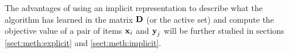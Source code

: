 The advantages of using an implicit representation to describe what the \mlblink algorithm has learned in the matrix $\boldsymbol{\mathbf{D}}$ (or the active set) and compute the objective value of a pair of items $\boldsymbol{\mathbf{x}}_i$ and $\boldsymbol{\mathbf{y}}_j$ will be further studied in sections \ref{sect:meth:explicit} and \ref{sect:meth:implicit}.